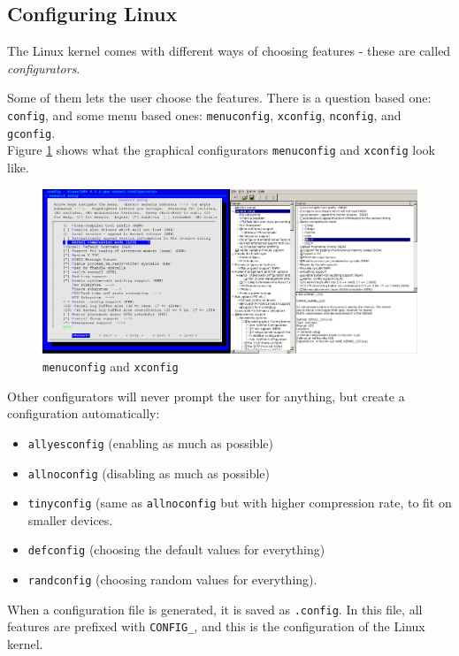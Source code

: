 \documentclass[a4paper,11pt]{report}
\newcommand{\figa}{
    \begin{figure}[!htpb]
    \centering
}
\newcommand{\figb}[2]{
    \caption{#1}
    \label{#2}
    \end{figure}
}
\begin{document}
            \subsection{Configuring Linux}
            \label{sec:conf}

The Linux kernel comes with different ways of choosing features - these are 
called \emph{configurators}. 

Some of them lets the user choose the features. There is a question based 
one: \texttt{config}, and some menu based ones: \texttt{menuconfig}, 
\texttt{xconfig}, \texttt{nconfig}, and \texttt{gconfig}.
\\

Figure \ref{fig:lineofconfigs} shows what the graphical 
configurators \texttt{menuconfig} and 
\texttt{xconfig} look like.
\\


\figa
    \includegraphics[scale=0.25]{pngs/2configs.png}
\figb{\texttt{menuconfig} and \texttt{xconfig}}{fig:lineofconfigs}

Other configurators will 
never prompt the user for anything, but create a configuration automatically: 
\begin{itemize}
    \item \texttt{allyesconfig} (enabling as much as possible) 
    \item \texttt{allnoconfig} (disabling as much as possible)
    \item \texttt{tinyconfig} (same as \texttt{allnoconfig} but with higher 
    compression rate, to fit on smaller devices.
    \item \texttt{defconfig} (choosing the default values for everything)
    \item \texttt{randconfig} (choosing random values for everything).
\end{itemize}


When a configuration file is generated, it is saved as \texttt{.config}.
In this file, all features are prefixed with \texttt{CONFIG\_}, and this is
the configuration of the Linux kernel. 
\end{document}
